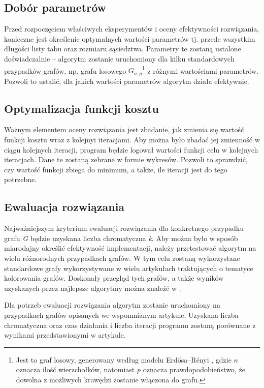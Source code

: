 \documentclass[12pt,a4paper]{article}
\begin{document}
\subsection{Dobór parametrów}
Przed rozpoczęciem właściwych eksperymentów i oceny efektywności rozwiązania, konieczne jest określenie optymalnych wartości parametrów tj. przede wszystkim długości listy tabu oraz rozmiaru sąsiedztwa. Parametry te zostaną ustalone doświadczalnie – algorytm zostanie uruchomiony dla kilku standardowych przypadków grafów, np. grafu losowego $G_{n,p}$\footnote{Jest to graf losowy, generowany według modelu Erdősa–Rényi \cite{erdos59a}, gdzie $n$ oznacza ilość wierzchołków, natomiast $p$ oznacza prawdopodobieństwo, że dowolna z możliwych krawędzi zostanie włączona do grafu.} z różnymi wartościami parametrów. Pozwoli to ustalić, dla jakich wartości parametrów algorytm działa efektywnie.

\subsection{Optymalizacja funkcji kosztu}
Ważnym elementem oceny rozwiązania jest zbadanie, jak zmienia się wartość funkcji kosztu wraz z kolejnyi iteracjami. Aby można było zbadać jej zmienność w ciągu kolejnych iteracji, program będzie logował wartości funkcji celu w kolejnych iteracjach. Dane te zostaną zebrane w formie wykresów. Pozwoli to sprawdzić, czy wartość funkcji zbiega do minimum, a także, ile iteracji jest do tego potrzebne.

\subsection{Ewaluacja rozwiązania}
Najważniejszym kryterium ewaluacji rozwiązania dla konkretnego przypadku grafu \textit{G} będzie uzyskana liczba chromatyczna \textit{k}. Aby można było w sposób miarodajny określić efektywność implementacji, należy przetestować algorytm na wielu różnorodnych przypadkach grafów. W tym celu zostaną wykorzystane standardowe grafy wykorzystywane w wielu artykułach traktujących o tematyce kolorowania grafów. Doskonały przegląd tych grafów, a także wyników uzyskanych przez najlepsze algorytmy można znaleźć w \cite{article}.

Dla potrzeb ewaluacji rozwiązania algorytm zostanie uruchomiony na przypadkach grafów opisanych we wspomnianym artykule. Uzyskana liczba chromatyczna oraz czas działania i liczba iteracji programu zostaną porównane z wynikami przedstawionymi w artykule.
\end{document}
